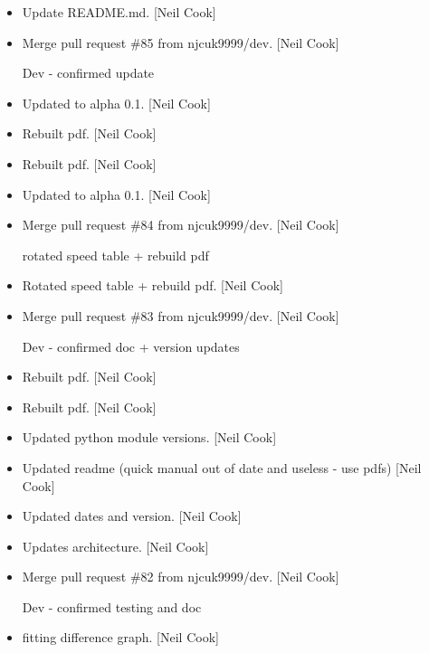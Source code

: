 \documentclass[a4paper,10pt,english]{report}
\begin{document}
\label{\detokenize{misc/changelog:id501}}\begin{itemize}
\item {} 
Update README.md. {[}Neil Cook{]}

\item {} 
Merge pull request \#85 from njcuk9999/dev. {[}Neil Cook{]}

Dev - confirmed update

\item {} 
Updated to alpha 0.1. {[}Neil Cook{]}

\item {} 
Rebuilt pdf. {[}Neil Cook{]}

\item {} 
Rebuilt pdf. {[}Neil Cook{]}

\item {} 
Updated to alpha 0.1. {[}Neil Cook{]}

\item {} 
Merge pull request \#84 from njcuk9999/dev. {[}Neil Cook{]}

rotated speed table + rebuild pdf

\item {} 
Rotated speed table + rebuild pdf. {[}Neil Cook{]}

\item {} 
Merge pull request \#83 from njcuk9999/dev. {[}Neil Cook{]}

Dev - confirmed doc + version updates

\item {} 
Rebuilt pdf. {[}Neil Cook{]}

\item {} 
Rebuilt pdf. {[}Neil Cook{]}

\item {} 
Updated python module versions. {[}Neil Cook{]}

\item {} 
Updated readme (quick manual out of date and useless - use pdfs) {[}Neil
Cook{]}

\item {} 
Updated dates and version. {[}Neil Cook{]}

\item {} 
Updates architecture. {[}Neil Cook{]}

\item {} 
Merge pull request \#82 from njcuk9999/dev. {[}Neil Cook{]}

Dev - confirmed testing and doc

\item {} 
 fitting difference graph. {[}Neil Cook{]}


\end{itemize}
\end{document}

